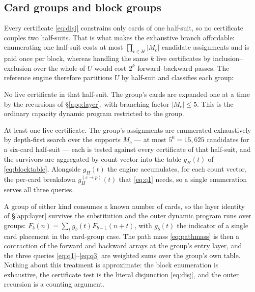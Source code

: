 \documentclass[11pt]{article}
\theoremstyle{definition}
\begin{document}
\subsection{Card groups and block groups}
\label{app:groups}

Every certificate \eqref{eq:disj} constrains only cards of one half-suit, so no
certificate couples two half-suits. That is what makes the exhaustive branch
affordable: enumerating one half-suit costs at most $\prod_{c \in H}|M_c|$
candidate assignments and is paid once per block, whereas handling the same $k$
live certificates by inclusion--exclusion over the whole of $U$ would cost $2^k$
forward--backward passes. The reference engine therefore partitions $U$
by half-suit and classifies each group:

\begin{description}[style=nextline]
  \item[Card group.] No live certificate in that half-suit. The group's cards are
        expanded one at a time by the recursions of \S\ref{app:layer}, with
        branching factor $|M_c| \le 5$. This is the ordinary capacity dynamic
        program restricted to the group.
  \item[Block group.] At least one live certificate. The group's assignments are
        enumerated exhaustively by depth-first search over the supports $M_c$ ---
        at most $5^6 = 15{,}625$ candidates for a six-card half-suit --- each is
        tested against every certificate of that half-suit, and the survivors are
        aggregated by count vector into the table $g_H(t)$ of
        \eqref{eq:blocktable}. Alongside $g_H(t)$ the engine accumulates, for
        each count vector, the per-card breakdown $g_H^{(c\to p)}(t)$ that
        \eqref{eq:q1} needs, so a single enumeration serves all three queries.
\end{description}

A group of either kind consumes a known number of cards, so the layer identity of
\S\ref{app:layer} survives the substitution and the outer dynamic program runs
over groups: $F_b(n) = \sum_t g_b(t) F_{b-1}(n+t)$, with $g_b(t)$ the indicator
of a single card placement in the card-group case. The path mass
\eqref{eq:pathmass} is then a contraction of the forward and backward arrays at
the group's entry layer, and the three queries \eqref{eq:q1}--\eqref{eq:q3} are
weighted sums over the group's own table. Nothing about this treatment is
approximate: the block enumeration is exhaustive, the certificate test is the
literal disjunction \eqref{eq:disj}, and the outer recursion is a counting
argument.
\end{document}
